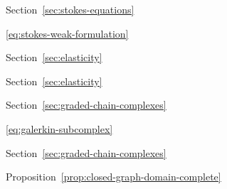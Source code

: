 \par\noindent\hspace*{0em}\label{index:stokes-equations}\quad Section~\ref{sec:stokes-equations}

\par\noindent\hspace*{1em}\label{index:stokes-equations-weak-formulation}\quad \eqref{eq:stokes-weak-formulation}

\par\noindent\hspace*{0em}\label{index:strain}\quad Section~\ref{sec:elasticity}

\par\noindent\hspace*{0em}\label{index:stress}\quad Section~\ref{sec:elasticity}

\par\noindent\hspace*{0em}\label{index:subcomplex}\quad Section~\ref{sec:graded-chain-complexes}

\par\noindent\hspace*{0em}\label{index:subcomplex-property}\quad \eqref{eq:galerkin-subcomplex}

\par\noindent\hspace*{0em}\label{index:subspace-graded}\quad Section~\ref{sec:graded-chain-complexes}

\par\noindent\hspace*{0em}\label{index:theorem}

\par\noindent\hspace*{1em}\label{index:theorem-closed-graph}\quad Proposition~\ref{prop:closed-graph-domain-complete}

